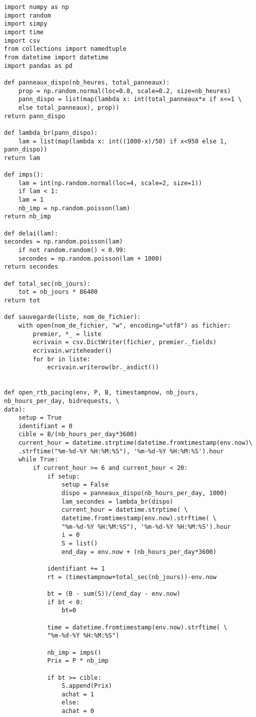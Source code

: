 \documentclass[12pt]{article}
\begin{document}
\begin{lstlisting}[style=Python]
import numpy as np
import random 
import simpy
import time
import csv
from collections import namedtuple
from datetime import datetime
import pandas as pd

def panneaux_dispo(nb_heures, total_panneaux):
	prop = np.random.normal(loc=0.8, scale=0.2, size=nb_heures)
	pann_dispo = list(map(lambda x: int(total_panneaux*x if x<=1 \
	else total_panneaux), prop))
return pann_dispo

def lambda_br(pann_dispo):
	lam = list(map(lambda x: int((1000-x)/50) if x<950 else 1, pann_dispo))
return lam

def imps():
	lam = int(np.random.normal(loc=4, scale=2, size=1))
	if lam < 1:
	lam = 1
	nb_imp = np.random.poisson(lam)
return nb_imp

def delai(lam):
secondes = np.random.poisson(lam)
	if not random.random() < 0.99:
	secondes = np.random.poisson(lam + 1000)
return secondes

def total_sec(nb_jours):
	tot = nb_jours * 86400
return tot

def sauvegarde(liste, nom_de_fichier):
	with open(nom_de_fichier, "w", encoding="utf8") as fichier:
		premier, *_ = liste
		ecrivain = csv.DictWriter(fichier, premier._fields)
		ecrivain.writeheader()
		for br in liste:
			ecrivain.writerow(br._asdict())
		
			
def open_rtb_pacing(env, P, B, timestampnow, nb_jours, nb_hours_per_day, bidrequests, \
data):
	setup = True
	identifiant = 0
	cible = B/(nb_hours_per_day*3600)
	current_hour = datetime.strptime(datetime.fromtimestamp(env.now)\
	.strftime("%m-%d-%Y %H:%M:%S"), '%m-%d-%Y %H:%M:%S').hour
	while True:
		if current_hour >= 6 and current_hour < 20:
			if setup:
				setup = False
				dispo = panneaux_dispo(nb_hours_per_day, 1000)
				lam_secondes = lambda_br(dispo)
				current_hour = datetime.strptime( \
				datetime.fromtimestamp(env.now).strftime( \
				"%m-%d-%Y %H:%M:%S"), '%m-%d-%Y %H:%M:%S').hour
				i = 0
				S = list()
				end_day = env.now + (nb_hours_per_day*3600)
			
			identifiant += 1
			rt = (timestampnow+total_sec(nb_jours))-env.now
			
			bt = (B - sum(S))/(end_day - env.now) 
			if bt < 0:
				bt=0
			
			time = datetime.fromtimestamp(env.now).strftime( \
			"%m-%d-%Y %H:%M:%S")
			
			nb_imp = imps()
			Prix = P * nb_imp
			
			if bt >= cible:
				S.append(Prix)
				achat = 1
				else:
				achat = 0
			

\end{lstlisting}
\end{document}
